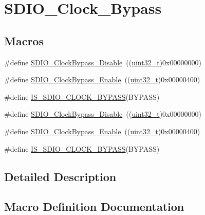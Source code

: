 \hypertarget{group___s_d_i_o___clock___bypass}{}\section{S\+D\+I\+O\+\_\+\+Clock\+\_\+\+Bypass}
\label{group___s_d_i_o___clock___bypass}
\subsection*{Macros}
\begin{DoxyCompactItemize}
\item 
\#define \hyperlink{group___s_d_i_o___clock___bypass_gacc168d55136a0c6575e5afd7a6550343}{S\+D\+I\+O\+\_\+\+Clock\+Bypass\+\_\+\+Disable}~((\hyperlink{_p_e___types_8h_a33594304e786b158f3fb30289278f5af}{uint32\+\_\+t})0x00000000)
\item 
\#define \hyperlink{group___s_d_i_o___clock___bypass_ga5e1e9f7e05ea62dd2315eb556bc10e5c}{S\+D\+I\+O\+\_\+\+Clock\+Bypass\+\_\+\+Enable}~((\hyperlink{_p_e___types_8h_a33594304e786b158f3fb30289278f5af}{uint32\+\_\+t})0x00000400)
\item 
\#define \hyperlink{group___s_d_i_o___clock___bypass_ga5d5a2fcdd3150e4a89c5aa1efd738dec}{I\+S\+\_\+\+S\+D\+I\+O\+\_\+\+C\+L\+O\+C\+K\+\_\+\+B\+Y\+P\+A\+SS}(B\+Y\+P\+A\+SS)
\item 
\#define \hyperlink{group___s_d_i_o___clock___bypass_gacc168d55136a0c6575e5afd7a6550343}{S\+D\+I\+O\+\_\+\+Clock\+Bypass\+\_\+\+Disable}~((\hyperlink{_p_e___types_8h_a33594304e786b158f3fb30289278f5af}{uint32\+\_\+t})0x00000000)
\item 
\#define \hyperlink{group___s_d_i_o___clock___bypass_ga5e1e9f7e05ea62dd2315eb556bc10e5c}{S\+D\+I\+O\+\_\+\+Clock\+Bypass\+\_\+\+Enable}~((\hyperlink{_p_e___types_8h_a33594304e786b158f3fb30289278f5af}{uint32\+\_\+t})0x00000400)
\item 
\#define \hyperlink{group___s_d_i_o___clock___bypass_ga5d5a2fcdd3150e4a89c5aa1efd738dec}{I\+S\+\_\+\+S\+D\+I\+O\+\_\+\+C\+L\+O\+C\+K\+\_\+\+B\+Y\+P\+A\+SS}(B\+Y\+P\+A\+SS)
\end{DoxyCompactItemize}


\subsection{Detailed Description}


\subsection{Macro Definition Documentation}
